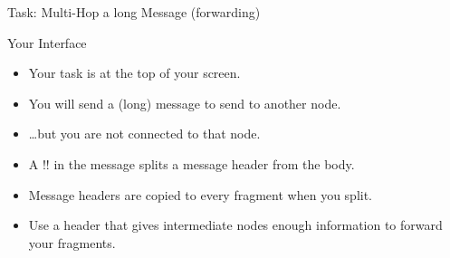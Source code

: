 \documentclass[svgnames]{beamer}
\begin{document}
\begin{frame}{Task: Multi-Hop a long Message (forwarding)}
\begin{block}{Your Interface}
\begin{itemize}
\item Your task is at the top of your screen.
\item You will send a (long) message to send to another node.
\item \dots but you are not connected to that node.
\item A \alert{!!} in the message splits a message header from the body.
\item Message headers are copied to every fragment when you \alert{split}.
\item Use a header that gives intermediate nodes enough information to forward your fragments.
\end{itemize}
\end{block}
\end{frame}
\end{document}
